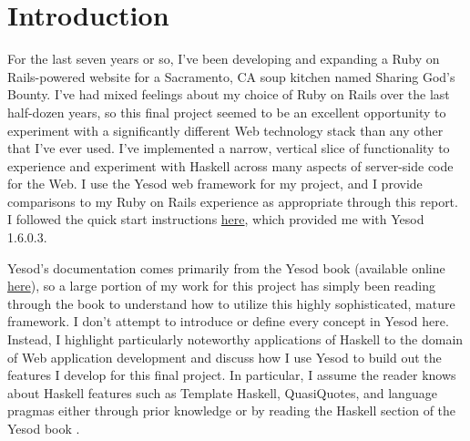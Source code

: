 \section{Introduction}

For the last seven years or so, I've been developing and expanding a Ruby on Rails-powered website for a Sacramento, CA soup kitchen named Sharing God's Bounty. I've had mixed feelings about my choice of Ruby on Rails over the last half-dozen years, so this final project seemed to be an excellent opportunity to experiment with a significantly different Web technology stack than any other that I've ever used. I've implemented a narrow, vertical slice of functionality to experience and experiment with Haskell across many aspects of server-side code for the Web. I use the Yesod web framework for my project, and I provide comparisons to my Ruby on Rails experience as appropriate through this report. I followed the quick start instructions \href{https://www.yesodweb.com/page/quickstart}{here}, which provided me with Yesod 1.6.0.3.

Yesod's documentation comes primarily from the Yesod book \cite{ybk} (available online \href{https://www.yesodweb.com/book}{here}), so a large portion of my work for this project has simply been reading through the book to understand how to utilize this highly sophisticated, mature framework. I don't attempt to introduce or define every concept in Yesod here. Instead, I highlight particularly noteworthy applications of Haskell to the domain of Web application development and discuss how I use Yesod to build out the features I develop for this final project. In particular, I assume the reader knows about Haskell features such as Template Haskell, QuasiQuotes, and language pragmas either through prior knowledge or by reading the Haskell section of the Yesod book \cite{ybkHaskell}.

